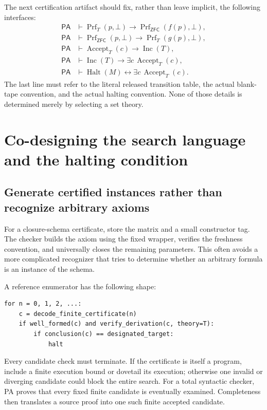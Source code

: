 \documentclass[11pt,letterpaper]{article}
\theoremstyle{definition}\newtheorem{definition}[theorem]{Definition}
\theoremstyle{remark}\newtheorem{remark}[theorem]{Remark}
\newcommand{\PA}{\mathsf{PA}}
\newcommand{\ZFC}{\mathsf{ZFC}}
\newcommand{\Inc}{\operatorname{Inc}}
\newcommand{\Prf}{\operatorname{Prf}}
\newcommand{\Halt}{\operatorname{Halt}}
\begin{document}
The next certification artifact should fix, rather than leave implicit,
the following interfaces:
\begin{equation}\label{eq:PAinterfaces}
\begin{aligned}
 \PA&\vdash \Prf_T(p,\bot)\to\Prf_{\ZFC}(f(p),\bot),\\
 \PA&\vdash \Prf_{\ZFC}(p,\bot)\to\Prf_T(g(p),\bot),\\
 \PA&\vdash \operatorname{Accept}_T(c)\to\Inc(T),\\
 \PA&\vdash \Inc(T)\to\exists c\,\operatorname{Accept}_T(c),\\
 \PA&\vdash \Halt(M)\leftrightarrow\exists c\,\operatorname{Accept}_T(c).
\end{aligned}
\end{equation}
The last line must refer to the literal released transition table, the
actual blank-tape convention, and the actual halting convention. None
of those details is determined merely by selecting a set theory.

\section{Co-designing the search language and the halting condition}
\label{sec:search}

\subsection{Generate certified instances rather than recognize arbitrary axioms}

For a closure-schema certificate, store the matrix and a small constructor
tag. The checker builds the axiom using the fixed wrapper, verifies the
freshness convention, and universally closes the remaining parameters.
This often avoids a more complicated recognizer that tries to determine
whether an arbitrary formula is an instance of the schema.

A reference enumerator has the following shape:
\begin{lstlisting}
for n = 0, 1, 2, ...:
    c = decode_finite_certificate(n)
    if well_formed(c) and verify_derivation(c, theory=T):
        if conclusion(c) == designated_target:
            halt
\end{lstlisting}
Every candidate check must terminate. If the certificate is itself a
program, include a finite execution bound or dovetail its execution;
otherwise one invalid or diverging candidate could block the entire
search. For a total syntactic checker, PA proves that every fixed
finite candidate is eventually examined. Completeness then translates
a source proof into one such finite accepted candidate.
\end{document}
